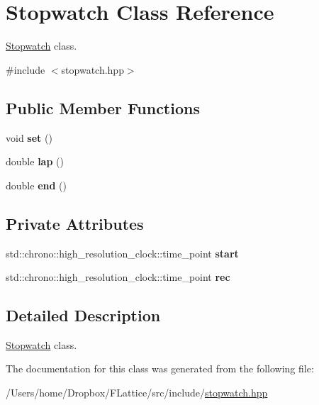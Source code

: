 \hypertarget{class_stopwatch}{}\section{Stopwatch Class Reference}
\label{class_stopwatch}


\mbox{\hyperlink{class_stopwatch}{Stopwatch}} class.  




{\ttfamily \#include $<$stopwatch.\+hpp$>$}

\subsection*{Public Member Functions}
\begin{DoxyCompactItemize}
\item 
\mbox{\label{class_stopwatch_aa58180166145ff2ee3340acf0a1b7f32}} 
void {\bfseries set} ()
\item 
\mbox{\label{class_stopwatch_a8e696ad9d0a92bafbccea81ff317da91}} 
double {\bfseries lap} ()
\item 
\mbox{\label{class_stopwatch_abf9e598738519353a858e962a4dd71a3}} 
double {\bfseries end} ()
\end{DoxyCompactItemize}
\subsection*{Private Attributes}
\begin{DoxyCompactItemize}
\item 
\mbox{\label{class_stopwatch_aedd5e689676ffd17b95e71a876f35a3b}} 
std\+::chrono\+::high\+\_\+resolution\+\_\+clock\+::time\+\_\+point {\bfseries start}
\item 
\mbox{\label{class_stopwatch_ac4b795adfe881690f1d2cd4760f28da1}} 
std\+::chrono\+::high\+\_\+resolution\+\_\+clock\+::time\+\_\+point {\bfseries rec}
\end{DoxyCompactItemize}


\subsection{Detailed Description}
\mbox{\hyperlink{class_stopwatch}{Stopwatch}} class. 

The documentation for this class was generated from the following file\+:\begin{DoxyCompactItemize}
\item 
/\+Users/home/\+Dropbox/\+F\+Lattice/src/include/\mbox{\hyperlink{stopwatch_8hpp}{stopwatch.\+hpp}}\end{DoxyCompactItemize}
